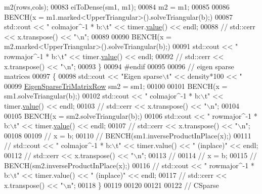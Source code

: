 \begin{DoxyCode}
{       m2(rows,cols);
00083       eiToDense(sm1, m1);
00084       m2 = m1;
00085 
00086       BENCH(x = m1.marked<UpperTriangular>().solveTriangular(b);)
00087       std::cout << \textcolor{stringliteral}{"   colmajor^-1 * b:\(\backslash\)t"} << timer.\hyperlink{class_eigen_1_1_bench_timer_a26760f963ed8b64c126159bfea57735e}{value}() << endl;
00088 \textcolor{comment}{//       std::cerr << x.transpose() << "\(\backslash\)n";}
00089 
00090       BENCH(x = m2.marked<UpperTriangular>().solveTriangular(b);)
00091       std::cout << \textcolor{stringliteral}{"   rowmajor^-1 * b:\(\backslash\)t"} << timer.\hyperlink{class_eigen_1_1_bench_timer_a26760f963ed8b64c126159bfea57735e}{value}() << endl;
00092 \textcolor{comment}{//       std::cerr << x.transpose() << "\(\backslash\)n";}
00093     \}
00094 \textcolor{preprocessor}{    #endif}
00095 
00096     \textcolor{comment}{// eigen sparse matrices}
00097     \{
00098       std::cout << \textcolor{stringliteral}{"Eigen sparse\(\backslash\)t"} << density*100 << \textcolor{stringliteral}{"%
00099       \hyperlink{group___sparse_core___module_class_eigen_1_1_sparse_matrix}{EigenSparseTriMatrixRow} sm2 = sm1;
00100 
00101       BENCH(x = sm1.solveTriangular(b);)
00102       std::cout << \textcolor{stringliteral}{"   colmajor^-1 * b:\(\backslash\)t"} << timer.\hyperlink{class_eigen_1_1_bench_timer_a26760f963ed8b64c126159bfea57735e}{value}() << endl;
00103 \textcolor{comment}{//       std::cerr << x.transpose() << "\(\backslash\)n";}
00104 
00105       BENCH(x = sm2.solveTriangular(b);)
00106       std::cout << \textcolor{stringliteral}{"   rowmajor^-1 * b:\(\backslash\)t"} << timer.\hyperlink{class_eigen_1_1_bench_timer_a26760f963ed8b64c126159bfea57735e}{value}() << endl;
00107 \textcolor{comment}{//       std::cerr << x.transpose() << "\(\backslash\)n";}
00108 
00109 \textcolor{comment}{//       x = b;}
00110 \textcolor{comment}{//       BENCH(sm1.inverseProductInPlace(x);)}
00111 \textcolor{comment}{//       std::cout << "   colmajor^-1 * b:\(\backslash\)t" << timer.value() << " (inplace)" << endl;}
00112 \textcolor{comment}{//       std::cerr << x.transpose() << "\(\backslash\)n";}
00113 \textcolor{comment}{//}
00114 \textcolor{comment}{//       x = b;}
00115 \textcolor{comment}{//       BENCH(sm2.inverseProductInPlace(x);)}
00116 \textcolor{comment}{//       std::cout << "   rowmajor^-1 * b:\(\backslash\)t" << timer.value() << " (inplace)" << endl;}
00117 \textcolor{comment}{//       std::cerr << x.transpose() << "\(\backslash\)n";}
00118     \}
00119 
00120 
00121 
00122     \textcolor{comment}{// CSparse}
}}
\end{DoxyCode}
